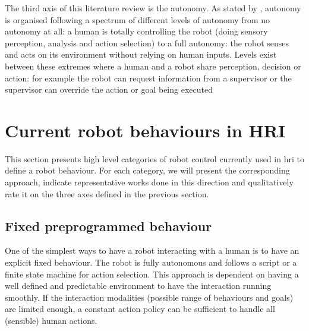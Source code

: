     The third axis of this literature review is the autonomy. As stated by \citet{beer2014toward}, autonomy is organised following a spectrum of different levels of autonomy from no autonomy at all: a human is totally controlling the robot (doing sensory perception, analysis and action selection) to a full autonomy: the robot senses and acts on its environment without relying on human inputs. Levels exist between these extremes where a human and a robot share perception, decision or action: for example the robot can request information from a supervisor or the supervisor can override the action or goal being executed
    

\section{Current robot behaviours in HRI} \label{sec:back_behaviour}

    This section presents high level categories of robot control currently used in \gls{hri} to define a robot behaviour. 
    For each category, we will present the corresponding approach, indicate representative works done in this direction and qualitatively rate it on the three axes defined in the previous section.
	
\subsection{Fixed preprogrammed behaviour}

    One of the simplest ways to have a robot interacting with a human is to have an explicit fixed behaviour. The robot is fully autonomous and follows a script or a finite state machine for action selection. This approach is dependent on having a well defined and predictable environment to have the interaction running smoothly. If the interaction modalities (possible range of behaviours and goals) are limited enough, a constant action policy can be sufficient to handle all (sensible) human actions. 
    
